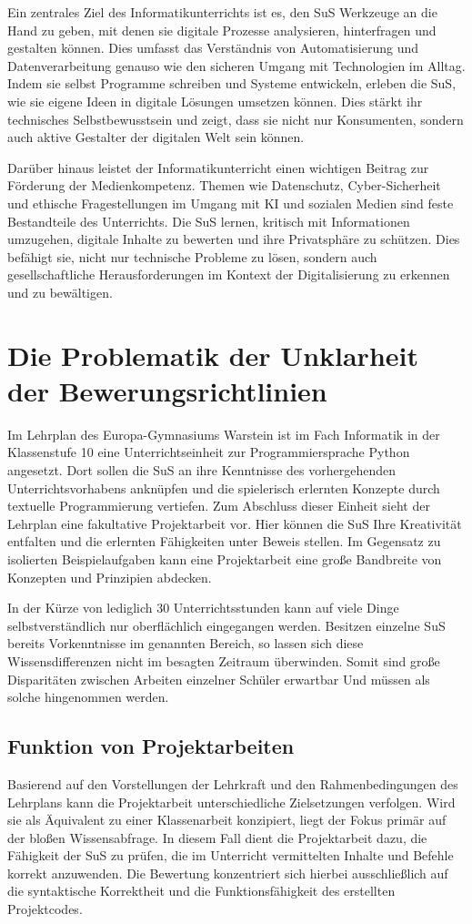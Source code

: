\documentclass[a4paper,12pt]{article}
\begin{document}
Ein zentrales Ziel des Informatikunterrichts ist es, den SuS Werkzeuge an die Hand zu geben, mit denen sie digitale Prozesse analysieren, hinterfragen und gestalten können. Dies umfasst das Verständnis von Automatisierung und Datenverarbeitung genauso wie den sicheren Umgang mit Technologien im Alltag. Indem sie selbst Programme schreiben und Systeme entwickeln, erleben die SuS, wie sie eigene Ideen in digitale Lösungen umsetzen können. Dies stärkt ihr technisches Selbstbewusstsein und zeigt, dass sie nicht nur Konsumenten, sondern auch aktive Gestalter der digitalen Welt sein können.

Darüber hinaus leistet der Informatikunterricht einen wichtigen Beitrag zur Förderung der Medienkompetenz. Themen wie Datenschutz, Cyber-Sicherheit und ethische Fragestellungen im Umgang mit KI und sozialen Medien sind feste Bestandteile des Unterrichts. Die SuS lernen, kritisch mit Informationen umzugehen, digitale Inhalte zu bewerten und ihre Privatsphäre zu schützen. Dies befähigt sie, nicht nur technische Probleme zu lösen, sondern auch gesellschaftliche Herausforderungen im Kontext der Digitalisierung zu erkennen und zu bewältigen.


\section{Die Problematik der Unklarheit der Bewerungsrichtlinien}
Im Lehrplan des Europa-Gymnasiums Warstein ist im Fach Informatik in der Klassenstufe 10 eine Unterrichtseinheit zur Programmiersprache Python angesetzt. Dort sollen die SuS an ihre Kenntnisse des vorhergehenden Unterrichtsvorhabens anknüpfen und die spielerisch erlernten Konzepte durch textuelle Programmierung vertiefen. Zum Abschluss dieser Einheit sieht der Lehrplan eine fakultative Projektarbeit vor. Hier können die SuS Ihre Kreativität entfalten und die erlernten Fähigkeiten unter Beweis stellen. Im Gegensatz zu isolierten Beispielaufgaben kann eine Projektarbeit eine große Bandbreite von Konzepten und Prinzipien abdecken.

In der Kürze von lediglich 30 Unterrichtsstunden kann auf viele Dinge selbstverständlich nur oberflächlich eingegangen werden. Besitzen einzelne SuS bereits Vorkenntnisse im genannten Bereich, so lassen sich diese Wissensdifferenzen nicht im besagten Zeitraum überwinden. Somit sind große Disparitäten zwischen Arbeiten einzelner Schüler erwartbar Und müssen als solche hingenommen werden.


\subsection{Funktion von Projektarbeiten}
Basierend auf den Vorstellungen der Lehrkraft und den Rahmenbedingungen des Lehrplans kann die Projektarbeit unterschiedliche Zielsetzungen verfolgen. Wird sie als Äquivalent zu einer Klassenarbeit konzipiert, liegt der Fokus primär auf der bloßen Wissensabfrage. In diesem Fall dient die Projektarbeit dazu, die Fähigkeit der SuS zu prüfen, die im Unterricht vermittelten Inhalte und Befehle korrekt anzuwenden. Die Bewertung konzentriert sich hierbei ausschließlich auf die syntaktische Korrektheit und die Funktionsfähigkeit des erstellten Projektcodes.
\end{document}
